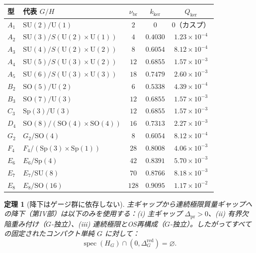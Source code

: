 \documentclass[12pt]{article}
\theoremstyle{plain}
\newtheorem{theorem}{定理}[section]
\theoremstyle{definition}
\numberwithin{equation}{section}
\newcommand{\spec}{\operatorname{spec}}
\newcommand{\pr}{\mathrm{pr}}
\newcommand{\red}{\mathrm{red}}
\newcommand{\br}{\mathrm{br}}
\newcommand{\kker}{\mathrm{ker}}
\begin{document}
\begin{center}
\begin{tabular}{llccc}
\toprule
型 & 代表 $G/H$ & $\nu_{\br}$ & $k_{\kker}$ & $Q_{\kker}$\\
\midrule
$A_1$ & $\mathrm{SU}(2)/\mathrm{U}(1)$ & $2$ & $0$ & $0$（カスプ）\\
$A_2$ & $\mathrm{SU}(3)/S(\mathrm{U}(2)\times\mathrm{U}(1))$ & $4$ & $0.4030$ & $1.23\times10^{-4}$\\
$A_3$ & $\mathrm{SU}(4)/S(\mathrm{U}(2)\times\mathrm{U}(2))$ & $8$ & $0.6054$ & $8.12\times10^{-4}$\\
$A_4$ & $\mathrm{SU}(5)/S(\mathrm{U}(3)\times\mathrm{U}(2))$ & $12$ & $0.6855$ & $1.57\times10^{-3}$\\
$A_5$ & $\mathrm{SU}(6)/S(\mathrm{U}(3)\times\mathrm{U}(3))$ & $18$ & $0.7479$ & $2.60\times10^{-3}$\\
$B_2$ & $\mathrm{SO}(5)/\mathrm{U}(2)$ & $6$ & $0.5338$ & $4.39\times10^{-4}$\\
$B_3$ & $\mathrm{SO}(7)/\mathrm{U}(3)$ & $12$ & $0.6855$ & $1.57\times10^{-3}$\\
$C_3$ & $\mathrm{Sp}(3)/\mathrm{U}(3)$ & $12$ & $0.6855$ & $1.57\times10^{-3}$\\
$D_4$ & $\mathrm{SO}(8)/(\mathrm{SO}(4)\times\mathrm{SO}(4))$ & $16$ & $0.7313$ & $2.27\times10^{-3}$\\
$G_2$ & $G_2/\mathrm{SO}(4)$ & $8$ & $0.6054$ & $8.12\times10^{-4}$\\
$F_4$ & $F_4/(\mathrm{Sp}(3)\times\mathrm{Sp}(1))$ & $28$ & $0.8008$ & $4.06\times10^{-3}$\\
$E_6$ & $E_6/\mathrm{Sp}(4)$ & $42$ & $0.8391$ & $5.70\times10^{-3}$\\
$E_7$ & $E_7/\mathrm{SU}(8)$ & $70$ & $0.8766$ & $8.18\times10^{-3}$\\
$E_8$ & $E_8/\mathrm{SO}(16)$ & $128$ & $0.9095$ & $1.17\times10^{-2}$\\
\bottomrule
\end{tabular}
\end{center}

\begin{theorem}[降下はゲージ群に依存しない]\label{thm:groupblind}
主ギャップから連続極限質量ギャップへの降下（第IV部）は以下のみを使用する：(i) 主ギャップ $\Delta_{\pr}>0$、(ii) 有界欠陥重み付け（$G$-独立）、(iii) 連続極限とOS再構成（$G$-独立）。したがってすべての固定されたコンパクト単純 $G$ に対して：
\begin{equation}
\boxed{\spec(H_G)\cap(0,\Delta_G^{\red})=\varnothing.}
\end{equation}
\end{theorem}
\end{document}
